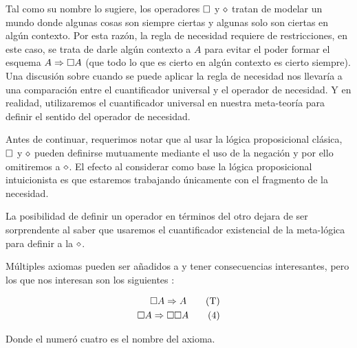 Tal como su nombre lo sugiere, los operadores $\square$ y $\diamond$ tratan de modelar un mundo donde algunas cosas son siempre ciertas y algunas solo son ciertas en algún contexto. Por esta razón, la regla de necesidad requiere de restricciones, en este caso, se trata de darle algún contexto a $A$ para evitar el poder formar el esquema $A \Rightarrow \square A$ (que todo lo que es cierto en algún contexto es cierto siempre). Una discusión sobre cuando se puede aplicar la regla de necesidad nos llevaría a una comparación entre el cuantificador universal y el operador de necesidad. Y en realidad, utilizaremos el cuantificador universal en nuestra meta-teoría para definir el sentido del operador de necesidad.

Antes de continuar, requerimos notar que al usar la lógica proposicional clásica, $\square$ y $\diamond$ pueden definirse mutuamente mediante el uso de la negación y por ello omitiremos a $\diamond$. El efecto al considerar como base la lógica proposicional intuicionista es que estaremos trabajando únicamente con el fragmento de la necesidad.

La posibilidad de definir un operador en términos del otro dejara de ser sorprendente al saber que usaremos el cuantificador existencial de la meta-lógica para definir a la $\diamond$.


Múltiples axiomas pueden ser añadidos a \K y tener consecuencias interesantes, pero los que nos interesan son los siguientes :


\begin{align}
  \square A \Rightarrow A \label{eqn:taxiom} \tag{T} \\
  \square A \Rightarrow \square \square A \label{eqn:4axiom}\tag{4}
\end{align}

Donde el numeró cuatro es el nombre del axioma.


